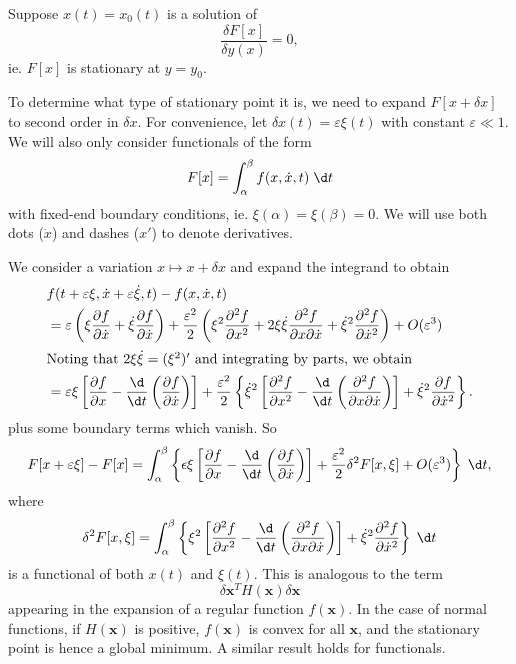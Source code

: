 \documentclass[a4paper]{article}
\begin{document}
Suppose $x(t) = x_0(t)$ is a solution of
\[
  \frac{\delta F[x]}{\delta y(x)} = 0,
\]
ie. $F[x]$ is stationary at $y = y_0$.

To determine what type of stationary point it is, we need to expand $F[x + \delta x]$ to second order in $\delta x$. For convenience, let $\delta x(t) = \varepsilon \xi(t)$ with constant $\varepsilon \ll 1$. We will also only consider functionals of the form
\[
  F[x] = \int_\alpha^\beta f(x, \dot{x}, t)\;\d t
\]
with fixed-end boundary conditions, ie. $\xi(\alpha) = \xi(\beta) = 0$. We will use both dots ($\dot{x}$) and dashes ($x'$) to denote derivatives.

We consider a variation $x \mapsto x + \delta x$ and expand the integrand to obtain
\begin{align*}
  &f(t + \varepsilon \xi, \dot{x} + \varepsilon \dot{\xi}, t) - f(x, \dot{x}, t)\\
  &= \varepsilon \left(\xi \frac{\partial f}{\partial \dot{x}} + \dot{\xi}\frac{\partial f}{\partial \dot{x}}\right)  + \frac{\varepsilon^2}{2}\left(\xi^2 \frac{\partial^2 f}{\partial x^2} + 2\xi\dot{\xi} \frac{\partial^2 f}{\partial x \partial \dot{x}} + \dot{\xi}^2 \frac{\partial^2 f}{\partial \dot{x}^2}\right) + O(\varepsilon^3)\\
  \intertext{Noting that $2\xi \dot{\xi} = (\xi^2)'$ and integrating by parts, we obtain}
  &= \varepsilon \xi\left[\frac{\partial f}{\partial x} - \frac{\d}{\d t}\left(\frac{\partial f}{\partial \dot{x}}\right)\right] + \frac{\varepsilon^2}{2}\left\{\dot{\xi}^2\left[\frac{\partial^2 f}{\partial x^2} - \frac{\d}{\d t}\left(\frac{\partial^2 f}{\partial x\partial \dot{x}}\right)\right] + \dot{\xi}^2 \frac{\partial f}{\partial \dot{x}^2}\right\}.
\end{align*}
plus some boundary terms which vanish. So
\[
  F[x + \varepsilon \xi] - F[x] = \int_\alpha^\beta\left\{\epsilon\xi\left[\frac{\partial f}{\partial x} - \frac{\d}{\d t}\left(\frac{\partial f}{\partial \dot{x}}\right)\right] + \frac{\varepsilon^2}{2}\delta^2 F[x, \xi] + O(\varepsilon^3)\right\}\;\d t,
\]
where
\[
  \delta^2 F[x,  \xi] = \int_\alpha^\beta \left\{\xi^2 \left[\frac{\partial^2 f}{\partial x^2} - \frac{\d}{\d t}\left(\frac{\partial^2 f}{\partial x \partial \dot{x}}\right)\right] + \dot{\xi}^2 \frac{\partial^2 f}{\partial \dot{x}^2}\right\}\;\d t
\]
is a functional of both $x(t)$ and $\xi(t)$. This is analogous to the term
\[
  \delta \mathbf{x}^T H(\mathbf{x})\delta \mathbf{x}
\]
appearing in the expansion of a regular function $f(\mathbf{x})$. In the case of normal functions, if $H(\mathbf{x})$ is positive, $f(\mathbf{x})$ is convex for all $\mathbf{x}$, and the stationary point is hence a global minimum. A similar result holds for functionals.
\end{document}
